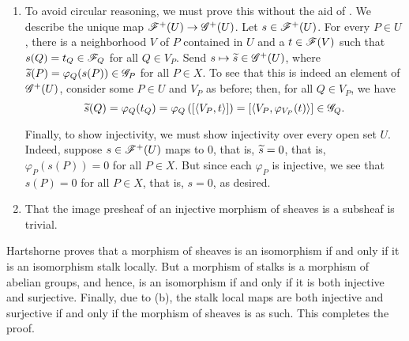 \begin{exercise}
\begin{enumerate}[label=(\alph*)]
    \item To avoid circular reasoning, we must prove this without the aid of . We describe the unique map $\mathscr{F}^+(U)\to\mathscr{G}^+(U)$. Let $s\in\mathscr{F}^+(U)$. For every $P\in U$, there is a neighborhood $V$ of $P$ contained in $U$ and a $t\in\mathscr{F}(V)$ such that $s(Q) = t_Q\in\mathscr{F}_Q$ for all $Q\in V_P$. Send $s\mapsto\widetilde{s}\in\mathscr{G}^+(U)$, where $\widetilde{s}(P) = \varphi_Q(s(P))\in\mathscr{G}_P$ for all $P\in X$. To see that this is indeed an element of $\mathscr{G}^+(U)$, consider some $P\in U$ and $V_P$ as before; then, for all $Q\in V_P$, we have 
    \begin{equation*}
        \widetilde{s}(Q) = \varphi_Q(t_Q) = \varphi_Q\left([\langle V_P, t\rangle]\right) = [\langle V_P, \varphi_{V_P}(t)\rangle]\in\mathscr{G}_Q.
    \end{equation*}

    Finally, to show injectivity, we must show injectivity over every open set $U$. Indeed, suppose $s\in\mathscr{F}^+(U)$ maps to $0$, that is, $\widetilde{s} = 0$, that is, $\varphi_P(s(P)) = 0$ for all $P\in X$. But since each $\varphi_P$ is injective, we see that $s(P) = 0$ for all $P\in X$, that is, $s = 0$, as desired.

    \item That the image presheaf of an injective morphism of sheaves is a subsheaf is trivial.
\end{enumerate}
\end{exercise}

\begin{exercise}
    Hartshorne proves that a morphism of sheaves is an isomorphism if and only if it is an isomorphism stalk locally. But a morphism of stalks is a morphism of abelian groups, and hence, is an isomorphism if and only if it is both injective and surjective. Finally, due to  (b), the stalk local maps are both injective and surjective if and only if the morphism of sheaves is as such. This completes the proof.
\end{exercise}

\begin{exercise}
    
\end{exercise}

\setcounter{exercise}{15}

